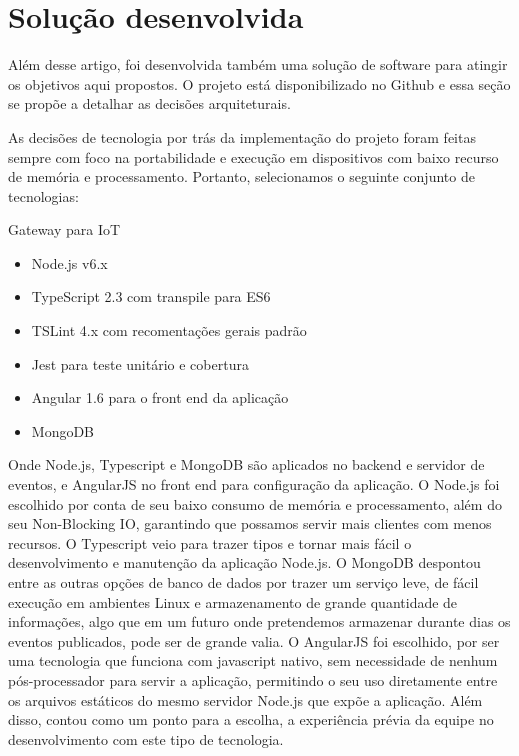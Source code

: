 \section{Solução desenvolvida}
\label{sec:iotGateway}

Além desse artigo, foi desenvolvida também uma solução de software para atingir os objetivos aqui propostos. O projeto está disponibilizado no Github \cite{IoTGatewayGithub} e essa seção se propõe a detalhar as decisões arquiteturais.

As decisões de tecnologia por trás da implementação do projeto foram feitas sempre com foco na portabilidade e execução em dispositivos com baixo recurso de memória e processamento. Portanto, selecionamos o seguinte conjunto de tecnologias:

Gateway para IoT
\begin{itemize}
	\item Node.js v6.x \cite{NodeJS}
	\item TypeScript 2.3 com transpile para ES6 \cite{Typescript}
	\item TSLint 4.x com recomentações gerais padrão \cite{TSLint}
	\item Jest para teste unitário e cobertura \cite{Jest}
	\item Angular 1.6 para o front end da aplicação \cite{AngularJS}
	\item MongoDB \cite{MongoDB}
\end{itemize}

Onde Node.js, Typescript e MongoDB são aplicados no backend e servidor de eventos, e AngularJS no front end para configuração da aplicação.
O Node.js foi escolhido por conta de seu baixo consumo de memória e processamento, além do seu Non-Blocking IO, garantindo que possamos servir mais clientes com menos recursos. O Typescript veio para trazer tipos e tornar mais fácil o desenvolvimento e manutenção da aplicação Node.js.
O MongoDB despontou entre as outras opções de banco de dados por trazer um serviço leve, de fácil execução em ambientes Linux e armazenamento de grande quantidade de informações, algo que em um futuro onde pretendemos armazenar durante dias os eventos publicados, pode ser de grande valia.
O AngularJS foi escolhido, por ser uma tecnologia que funciona com javascript nativo, sem necessidade de nenhum pós-processador para servir a aplicação, permitindo o seu uso diretamente entre os arquivos estáticos do mesmo servidor Node.js que expõe a aplicação. Além disso, contou como um ponto para a escolha, a experiência prévia da equipe no desenvolvimento com este tipo de tecnologia.

